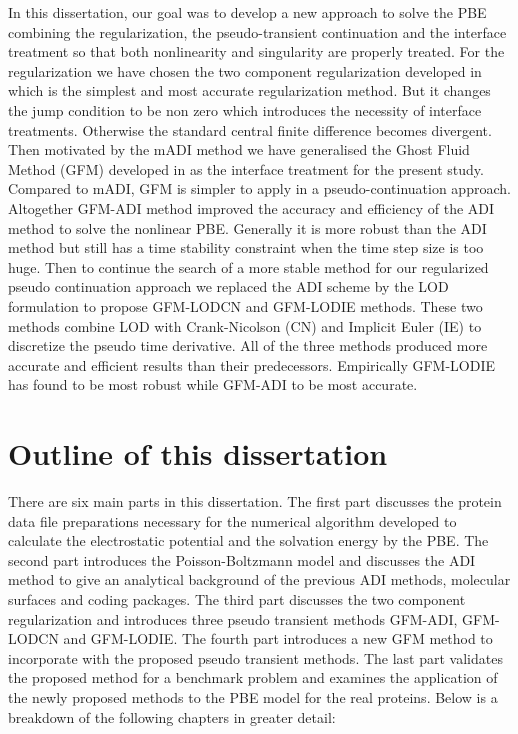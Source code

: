 In this dissertation, our goal was to develop a new approach to solve the PBE combining the regularization, the pseudo-transient continuation and the interface treatment so that both nonlinearity and singularity are properly treated. For the regularization we have chosen  the two component regularization developed in \cite{Geng2017a} which is the simplest and most accurate regularization method. But it changes the jump condition to be non zero which introduces the necessity of interface treatments. Otherwise the standard central finite difference becomes divergent. Then motivated by the mADI method we have generalised the Ghost Fluid Method (GFM) developed in \cite{Fedkiw1999} as the interface treatment for the present study. Compared to mADI, GFM is simpler to apply in a pseudo-continuation approach. Altogether GFM-ADI method improved the accuracy and efficiency of the ADI method to solve the nonlinear PBE. Generally it is more robust than the ADI method but still has a time stability constraint when the time step size is too huge. Then to continue the search of a more stable method for our regularized pseudo continuation approach we replaced the ADI scheme by the LOD formulation to propose GFM-LODCN and GFM-LODIE methods. These two methods combine LOD  with Crank-Nicolson (CN) and Implicit Euler (IE) to discretize the pseudo time derivative. All of the three methods produced more accurate and efficient results  than their predecessors. Empirically GFM-LODIE has found to be most robust while GFM-ADI to be most accurate. 
\section{Outline of this dissertation}
There are six main parts in this dissertation. The first part discusses the protein data file preparations necessary for the numerical algorithm developed to calculate the electrostatic potential and the solvation energy by the PBE. The second part introduces the Poisson-Boltzmann model and discusses the ADI method \cite{Geng2013_Fully} to give an analytical background of the previous ADI methods, molecular surfaces and coding packages. The third part discusses the two component regularization and introduces three pseudo transient methods GFM-ADI, GFM-LODCN and GFM-LODIE.  The fourth part introduces a new GFM method to incorporate with the proposed pseudo transient methods. The last part validates the proposed method for a benchmark problem and examines the application of the newly proposed methods to the PBE model for the real proteins. Below is a breakdown of the following chapters in greater detail:  
  

